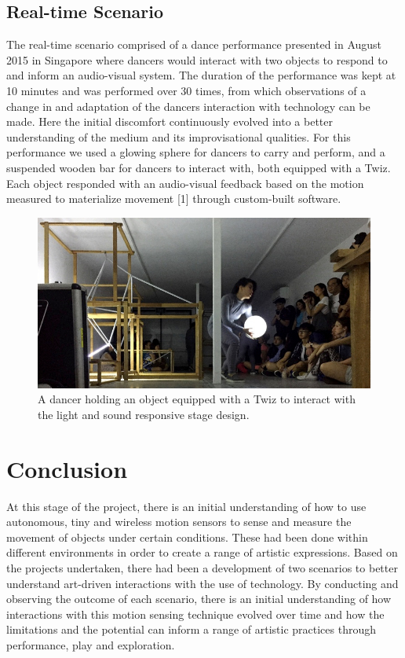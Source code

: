 \documentclass{sigchi}
\begin{document}
\subsection{Real-time Scenario}
The real-time scenario comprised of a dance
performance presented in August 2015 in Singapore
where dancers would interact with two objects to
respond to and inform an audio-visual system. The
duration of the performance was kept at 10 minutes
and was performed over 30 times, from which
observations of a change in and adaptation of the
dancers interaction with technology can be made. Here
the initial discomfort continuously evolved into a better
understanding of the medium and its improvisational
qualities. For this performance we used a glowing
sphere for dancers to carry and perform, and a
suspended wooden bar for dancers to interact with,
both equipped with a Twiz. Each object responded with
an audio-visual feedback based on the motion
measured to materialize movement [1] through
custom-built software.

\begin{figure}[H]
\centering
\includegraphics[width=\columnwidth]{pics/performance}
\caption{A dancer holding an object equipped with a Twiz to
interact with the light and sound responsive stage design.}
\label{fig:performance}
\end{figure}

\section{Conclusion}

At this stage of the project, there is an initial
understanding of how to use autonomous, tiny and
wireless motion sensors to sense and measure the
movement of objects under certain conditions. These
had been done within different environments in order to
create a range of artistic expressions. Based on the
projects undertaken, there had been a development of
two scenarios to better understand art-driven
interactions with the use of technology.
By conducting and observing the outcome of each
scenario, there is an initial understanding of how
interactions with this motion sensing technique evolved
over time and how the limitations and the potential can
inform a range of artistic practices through
performance, play and exploration.
\end{document}
